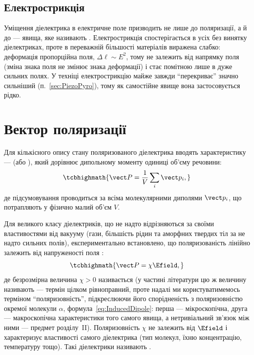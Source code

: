 \subsection*{Електрострикція}

Уміщення діелектрика в електричне поле призводить не лише до поляризації, а й до  --- явища, яке називають
. Електрострикція спостерігається в усіх без винятку діелектриках, проте в переважній більшості матеріалів виражена слабко:
деформація пропорційна  поля, $\Delta \ell \sim E^2$, тому не залежить від напрямку поля (зміна знака поля не змінює знака деформації) і
стає помітною лише в дуже сильних полях. У техніці електрострикцію майже завжди \enquote{перекриває} значно сильніший 
(п.~\ref{sec:PiezoPyro}), тому як самостійне явище вона застосовується рідко.

\section{Вектор поляризації}

Для кількісного опису стану поляризованого діелектрика вводять  характеристику ---  (або
), який дорівнює дипольному моменту одиниці об'єму речовини:
\begin{equation}\label{eq:Pdef}
	\tcbhighmath{
		\vect P = \frac1V \sum_i \vect p_i,
	}
\end{equation}
де підсумовування проводиться за всіма молекулярними диполями $\vect p_i$, що потрапляють у фізично малий об'єм $V$.

Для великого класу діелектриків, що не надто відрізняються за своїми властивостями від вакууму (гази, більшість рідин та аморфних твердих тіл за не
надто сильних полів), експериментально встановлено, що поляризованість лінійно залежить від напруженості поля :
\begin{equation}\label{eq:PlinearE}
	\tcbhighmath{
		\vect P = \chi \Efield,
	}
\end{equation}
де безрозмірна величина $\chi > 0$ називається  (у частині літератури цю ж величину називають  --- термін цілком рівноправний, проте надалі ми користуватимемось терміном \enquote{поляризовність}, підкреслюючи його спорідненість
з поляризовністю окремої молекули $\alpha$, формула~\eqref{eq:InducedDipole}: перша --- мікроскопічна, друга --- макроскопічна характеристики того
самого явища, а нетривіальний зв'язок між ними --- предмет розділу~II). Поляризовність $\chi$
не залежить від $\Efield$ і характеризує властивості самого діелектрика (тип молекул, їхню концентрацію, температуру тощо). Такі діелектрики
називають .

